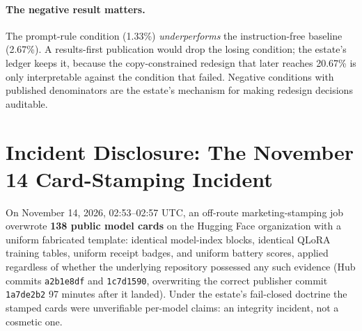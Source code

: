 \paragraph{The negative result matters.} The prompt-rule condition (1.33\%) \emph{underperforms} the instruction-free baseline (2.67\%). A results-first publication would drop the losing condition; the estate's ledger keeps it, because the copy-constrained redesign that later reaches 20.67\% is only interpretable against the condition that failed. Negative conditions with published denominators are the estate's mechanism for making redesign decisions auditable.

\section{Incident Disclosure: The November 14 Card-Stamping Incident}
\label{sec:incident}

On November 14, 2026, 02:53--02:57 UTC, an off-route marketing-stamping job overwrote \textbf{138 public model cards} on the Hugging Face organization with a uniform fabricated template: identical model-index blocks, identical QLoRA training tables, uniform receipt badges, and uniform battery scores, applied regardless of whether the underlying repository possessed any such evidence (Hub commits \texttt{a2b1e8df} and \texttt{1c7d1590}, overwriting the correct publisher commit \texttt{1a7de2b2} 97 minutes after it landed). Under the estate's fail-closed doctrine the stamped cards were unverifiable per-model claims: an integrity incident, not a cosmetic one.

